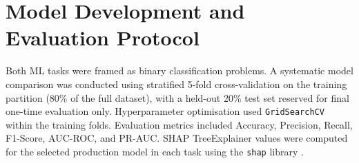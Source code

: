 \section{Model Development and Evaluation Protocol}

Both ML tasks were framed as binary classification problems. A systematic
model comparison was conducted using stratified 5-fold cross-validation on
the training partition (80\% of the full dataset), with a held-out 20\%
test set reserved for final one-time evaluation only. Hyperparameter
optimisation used \texttt{GridSearchCV} within the training folds.
Evaluation metrics included Accuracy, Precision, Recall, F1-Score,
AUC-ROC, and PR-AUC. SHAP TreeExplainer values were computed for the
selected production model in each task using the \texttt{shap} library
\citep{lundberg2017shap}.

